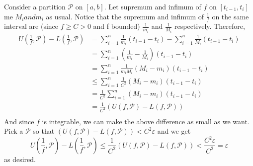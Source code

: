 \documentclass{article}
\newcommand{\parti}{\mathcal{P}}
\begin{document}
Consider a partition $\parti$ on $[a,b]$. Let supremum and infimum of $f$ on $[t_{i-1}, t_{i}]$ me $M_{i} and m_{i}$ as usual. Notice that the supremum and infimum of $\frac{1}{f}$ on the same interval are (since $f \geq C > 0$ and f bounded) $\frac{1}{m_{i}}$ and $\frac{1}{M_{i}}$ respectively. Therefore, 
\begin{align*}
U(\frac{1}{f}, \parti) - L(\frac{1}{f}, \parti) &= \sum_{i=1}^{n} \frac{1}{m_{i}}(t_{i-1} - t_{i}) - \sum_{i=1}^{n} \frac{1}{M_{i}}(t_{i-1} - t_{i})\\
&= \sum_{i=1}^{n} (\frac{1}{m_{i}} - \frac{1}{M_{i}})(t_{i-1} - t_{i})\\
&= \sum_{i=1}^{n} \frac{1}{m_{i}M_{i}}(M_{i} - m_{i})(t_{i-1} - t_{i})\\
&\leq \sum_{i=1}^{n} \frac{1}{C^{2}}(M_{i} - m_{i})(t_{i-1} - t_{i})\\
&=\frac{1}{C^{2}}\sum_{i=1}^{n} (M_{i} - m_{i})(t_{i-1} - t_{i})\\
&=\frac{1}{C^{2}}(U(f, \parti) - L(f, \parti))\\
\end{align*}
And since $f$ is integrable, we can make the above difference as small as we want. Pick a $\parti$ so that $(U(f, \parti) - L(f, \parti)) < C^{2}\varepsilon$ and we get 
\begin{equation*}
U(\frac{1}{f}, \parti) - L(\frac{1}{f}, \parti) \leq \frac{1}{C^{2}}(U(f, \parti) - L(f, \parti)) < \frac{C^{2}\varepsilon}{C^{2}} = \varepsilon
\end{equation*}
as desired.
\end{document}
